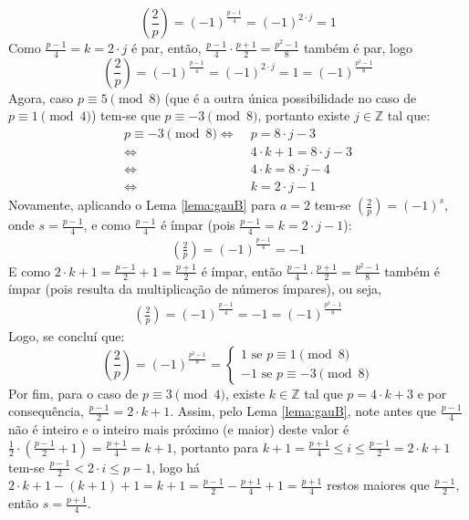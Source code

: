 \begin{equation*}
    \left(\frac{2}{p}\right) = (-1)^{\frac{p-1}{4}} = (-1)^{2 \cdot j} = 1
\end{equation*}
Como $\frac{p-1}{4} = k = 2 \cdot j$ é par, então, $\frac{p-1}{4} \cdot \frac{p+1}{2} = \frac{p^2 - 1}{8}$ também é par, logo 
\begin{equation*}
    \left(\frac{2}{p}\right) = (-1)^{\frac{p-1}{4}} = (-1)^{2 \cdot j} = 1 = (-1)^{\frac{p^2 - 1}{8}}
\end{equation*}
Agora, caso $p \equiv 5 \pmod{8}$ (que é a outra única possibilidade no caso de $p \equiv 1 \pmod{4}$) tem-se que $p \equiv -3 \pmod{8}$, portanto existe $j \in \mathbb{Z}$ tal que:
\begin{align*}
    p \equiv -3 \pmod{8}
    \Longleftrightarrow \; & p = 8 \cdot j - 3
    \\
    \Longleftrightarrow \; & 4 \cdot k + 1 = 8 \cdot j - 3
    \\
    \Longleftrightarrow \; & 4 \cdot k = 8 \cdot j - 4
    \\
    \Longleftrightarrow \; & k = 2 \cdot j - 1
\end{align*}
Novamente, aplicando o Lema \ref{lema:gauB} para $a = 2$ tem-se $\left(\frac{2}{p} \right) = (-1)^s$, onde $s = \frac{p-1}{4}$, e como $\frac{p-1}{4}$ é ímpar (pois $\frac{p-1}{4} = k = 2 \cdot j - 1$):
\begin{align*}
    \left(\frac{2}{p} \right) = (-1)^{\frac{p-1}{4}} = -1
\end{align*}
E como $2 \cdot k + 1 = \frac{p-1}{2} + 1 = \frac{p+1}{2}$ é ímpar, então $\frac{p-1}{4} \cdot \frac{p+1}{2} = \frac{p^2 - 1}{8}$ também é ímpar (pois resulta da multiplicação de números ímpares), ou seja,
\begin{align*}
    \left(\frac{2}{p} \right) = (-1)^{\frac{p-1}{4}} = -1 = (-1)^{\frac{p^2-1}{8}}
\end{align*}
Logo, se concluí que:
\begin{equation} \label{eq:casesrecip1}
    \left(\frac{2}{p} \right) = (-1)^{\frac{p^2 - 1}{8}} = \begin{cases}
            1 \text{ se $p \equiv 1 \pmod{8}$}
            \\
            -1 \text{ se $p \equiv -3 \pmod{8}$}
            \end{cases}
\end{equation}
Por fim, para o caso de $p \equiv 3 \pmod{4}$, existe $k \in \mathbb{Z}$ tal que $p = 4 \cdot k + 3$ e por consequência, $\frac{p-1}{2} = 2 \cdot k + 1$. Assim, pelo Lema \ref{lema:gauB}, note antes que $\frac{p-1}{4}$ não é inteiro e o inteiro mais próximo (e maior) deste valor é $\frac{1}{2} \cdot (\frac{p-1}{2} + 1) = \frac{p+1}{4} = k + 1$, portanto para $k + 1 = \frac{p+1}{4} \leq i \leq \frac{p-1}{2} = 2 \cdot k + 1$ tem-se
$\frac{p-1}{2} < 2 \cdot i \leq p-1$, logo há 
$2 \cdot k + 1 - (k + 1) + 1 = k + 1 = \frac{p-1}{2} - \frac{p+1}{4} + 1 = \frac{p + 1}{4}$ restos maiores que $\frac{p-1}{2}$, então $s = \frac{p+1}{4}$.

